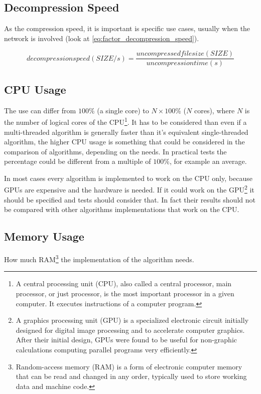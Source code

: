 \documentclass[12pt, a4paper]{report}
\begin{document}
\subsection{Decompression Speed}

As the compression speed, it is important is specific use cases, usually when the network is involved (look at
\autoref{eq:factor_decompression_speed}).

\begin{equation} \label{eq:factor_decompression_speed}
  decompression speed (SIZE / s) = \frac{uncompressed file size (SIZE)}{uncompression time (s)}
\end{equation}

\subsection{CPU Usage}

The use can differ from \(100 \%\) (a single core) to \(N \times 100 \%\) (\(N\) cores), where \(N\) is the number of logical
cores of the CPU\footnote{A central processing unit (CPU), also called a central processor, main processor, or just processor, is
the most important processor in a given computer. It executes instructions of a computer program.}.
It has to be considered than even if a multi-threaded algorithm is generally faster than it's equivalent single-threaded
algorithm, the higher CPU usage is something that could be considered in the comparison of algorithms, depending on the needs.
In practical tests the percentage could be different from a multiple of \(100 \%\), for example an average.

In most cases every algorithm is implemented to work on the CPU only, because GPUs are expensive and the hardware is needed.
If it could work on the GPU\footnote{A graphics processing unit (GPU) is a specialized electronic circuit initially designed for
digital image processing and to accelerate computer graphics. After their initial design, GPUs were found to be useful for
non-graphic calculations computing parallel programs very efficiently.} it should be specified and tests should consider that.
In fact their results should not be compared with other algorithms implementations that work on the CPU.

\subsection{Memory Usage}

How much RAM\footnote{Random-access memory (RAM) is a form of electronic computer memory that can be read and changed in any
order, typically used to store working data and machine code.} the implementation of the algorithm needs.
\end{document}
